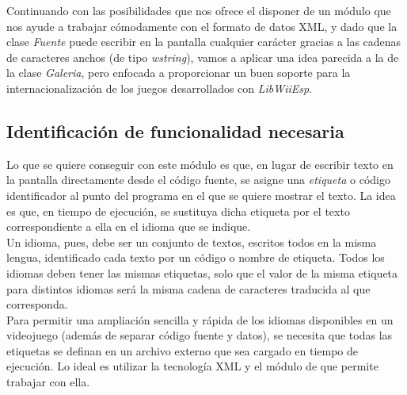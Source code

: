 



Continuando con las posibilidades que nos ofrece el disponer de un módulo que nos ayude a trabajar cómodamente con el formato de datos XML, y dado que la clase \emph{Fuente} puede escribir en la pantalla cualquier carácter gracias a las cadenas de caracteres anchos (de tipo \emph{wstring}), vamos a aplicar una idea parecida a la de la clase \emph{Galeria}, pero enfocada a proporcionar un buen soporte para la internacionalización de los juegos desarrollados con \emph{LibWiiEsp}.

\subsection{Identificación de funcionalidad necesaria}

Lo que se quiere conseguir con este módulo es que, en lugar de escribir texto en la pantalla directamente desde el código fuente, se asigne una \emph{etiqueta} o código identificador al punto del programa en el que se quiere mostrar el texto. La idea es que, en tiempo de ejecución, se sustituya dicha etiqueta por el texto correspondiente a ella en el idioma que se indique.\\

Un idioma, pues, debe ser un conjunto de textos, escritos todos en la misma lengua, identificado cada texto por un código o nombre de etiqueta. Todos los idiomas deben tener las mismas etiquetas, solo que el valor de la misma etiqueta para distintos idiomas será la misma cadena de caracteres traducida al que corresponda.\\

Para permitir una ampliación sencilla y rápida de los idiomas disponibles en un videojuego (además de separar código fuente y datos), se necesita que todas las etiquetas se definan en un archivo externo que sea cargado en tiempo de ejecución. Lo ideal es utilizar la tecnología XML y el módulo de  que permite trabajar con ella.\\

